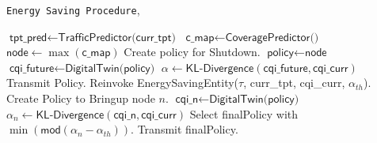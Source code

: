 \begin{algorithm} [t!]
    \caption{
        \texttt{Energy Saving Procedure},
    }
    \begin{algorithmic} [1]
            \State $\textsf{tpt\_pred} \gets \textsf{TrafficPredictor(curr\_tpt)}$
                \State $\textsf{c\_map} \gets \textsf{CoveragePredictor()}$
                \State $\textsf{node} \gets \max(\textsf{c\_map})$ 
                \State Create \textsf{policy} for Shutdown.
                \State $\textsf{policy} \gets \textsf{node}$
                \State $\textsf{cqi\_future} \gets \textsf{DigitalTwin(policy)}$
                \State $\alpha \gets \textsf{KL-Divergence}(\textsf{cqi\_future}, \textsf{cqi\_curr})$
                    \State Transmit \textsf{Policy}.
                \Else
                    \State Reinvoke \textsf{EnergySavingEntity($\tau$, curr\_tpt, cqi\_curr, $\alpha_{th}$)}.
                \EndIf
            \Else
                    \State Create \textsf{Policy} to Bringup node $n$.
                    \State $\textsf{cqi\_n} \gets \textsf{DigitalTwin(policy)}$
                    \State $\alpha_{n} \gets \textsf{KL-Divergence}(\textsf{cqi\_n}, \textsf{cqi\_curr})$
                \EndFor
                \State Select \textsf{finalPolicy} with $\min \left(\textsf{mod}(\alpha_{n} - \alpha_{th})\right)$.
                \State Transmit \textsf{finalPolicy}.
            \EndIf
        \EndProcedure
    \end{algorithmic}
    \label{alg:energy_saving_algo}
\end{algorithm}